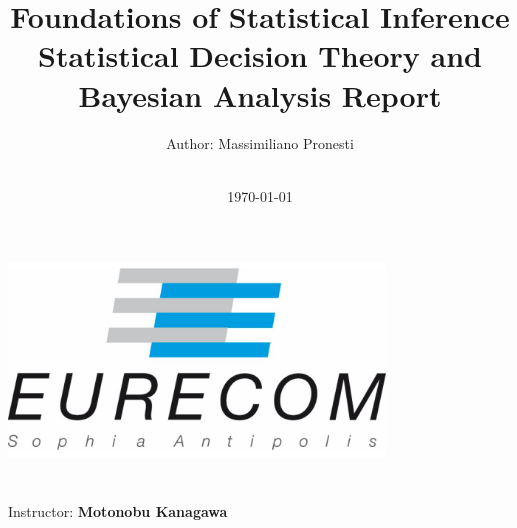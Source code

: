 \title{\Large Foundations of Statistical Inference  \\[0.5cm]
	\bf\Large Statistical Decision
	Theory and
	Bayesian Analysis 
Report }
\author{\large Author: Massimiliano Pronesti\\ \ \\}
\date{\large \today}

\makeatletter
\begin{titlepage}
	\begin{center}
		{ \includegraphics[width=10cm]{../eurecom.png}}
		{\ \\ \ \\}
		\vbox{}\vspace{5cm}
		{\@title }\\[3cm] 
		{\@author}
		{\large Instructor: \bf Motonobu Kanagawa\\ \ \\}
		{\@date\\}
		
	\end{center}
\end{titlepage}
\makeatother